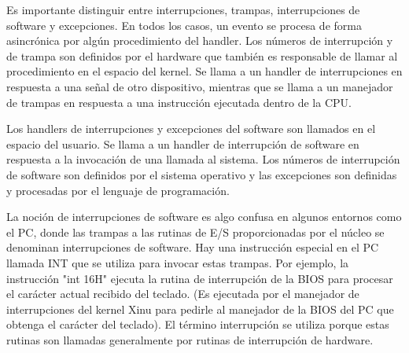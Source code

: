 \documentclass[12pt]{article}
\begin{document}
{Es importante distinguir entre interrupciones, trampas, interrupciones de software y excepciones. En todos los casos, un evento se procesa de forma asincrónica por algún procedimiento del handler. Los números de interrupción y de trampa son definidos por el hardware que también es responsable de llamar al procedimiento en el espacio del kernel. Se llama a un handler de interrupciones en respuesta a una señal de otro dispositivo, mientras que se llama a un manejador de trampas en respuesta a una instrucción ejecutada dentro de la CPU.

Los handlers de interrupciones y excepciones del software son llamados en el espacio del usuario. Se llama a un handler de interrupción de software en respuesta a la invocación de una llamada al sistema. Los números de interrupción de software son definidos por el sistema operativo y las excepciones son definidas y procesadas por el lenguaje de programación.

La noción de interrupciones de software es algo confusa en algunos entornos como el PC, donde las trampas a las rutinas de E/S proporcionadas por el núcleo se denominan interrupciones de software. Hay una instrucción especial en el PC llamada INT que se utiliza para invocar estas trampas. Por ejemplo, la instrucción "int 16H" ejecuta la rutina de interrupción de la BIOS para procesar el carácter actual recibido del teclado. (Es ejecutada por el manejador de interrupciones del kernel Xinu para pedirle al manejador de la BIOS del PC que obtenga el carácter del teclado). El término interrupción se utiliza porque estas rutinas son llamadas generalmente por rutinas de interrupción de hardware.\citep{LambdaEcu}


\medskip

 



}
\end{document}

